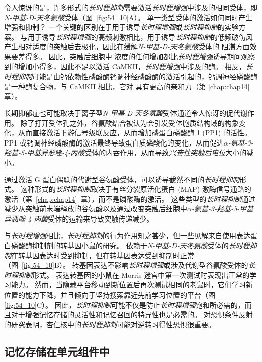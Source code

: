 令人惊讶的是，许多形式的\textit{长时程抑制}需要激活\textit{长时程增强}中涉及的相同受体，即\textit{N-甲基-D-天冬氨酸}受体（图~\ref{fig:54_10}A）。
单一类型受体的激活如何同时产生增强和抑制？
一个关键的区别在于用于诱导\textit{长时程增强}或\textit{长时程抑制}的实验方案。
与用于诱导\textit{长时程增强}的高频刺激相比，用于诱导\textit{长时程抑制}的低频破伤风产生相对适度的突触后去极化，因此在缓解\textit{N-甲基-D-天冬氨酸}受体的  阻滞方面效果要差得多。
因此，突触后细胞中  浓度的任何增加都比\textit{长时程增强}诱导期间观察到的增加小得多，因此不足以激活 CaMKII，\textit{长时程增强}中涉及的酶。
相反，\textit{长时程抑制}可能是由钙依赖性磷酸酶钙调神经磷酸酶的激活引起的，钙调神经磷酸酶是一种酶复合物，与 CaMKII 相比，它对  具有更高的亲和力（第 \ref{chap:chap14} 章）。


长期抑郁症也可能取决于离子型\textit{N-甲基-D-天冬氨酸}受体通道令人惊讶的促代谢作用。
除了打开受体孔之外，谷氨酸结合被认为会引发受体胞质结构域的构象变化，从而直接激活下游信号级联反应，从而增加磷蛋白磷酸酶 1 (PP1) 的活性。
PP1 或钙调神经磷酸酶的激活最终导致蛋白质磷酸化的变化，从而促进\textit{$\alpha$-氨基-3-羟基-5-甲基异恶唑-4-丙酸}受体的内吞作用，从而导致\textit{兴奋性突触后电位}大小的减小。


通过激活 G 蛋白偶联的代谢型谷氨酸受体，可以诱导截然不同的\textit{长时程抑制}形式。
这种形式的\textit{长时程抑制}取决于有丝分裂原活化蛋白 (MAP) 激酶信号通路的激活（第~\ref{chap:chap14}~章），而不是磷酸酶的激活。
这些类型的\textit{长时程抑制}通过减少从突触前末端释放的谷氨酸以及通过改变突触后细胞中\textit{$\alpha$-氨基-3-羟基-5-甲基异恶唑-4-丙酸}受体的运输来导致突触传递减少。


与\textit{长时程增强}相比，\textit{长时程抑制}的行为作用知之甚少，但一些见解来自使用表达蛋白磷酸酶抑制剂的转基因小鼠的研究。
依赖于\textit{N-甲基-D-天冬氨酸}受体的\textit{长时程抑制}在转基因表达时受到抑制，但在转基因表达受到抑制时正常（图~\ref{fig:54_10}B）。
转基因表达不影响\textit{长时程增强}或涉及代谢型谷氨酸受体的\textit{长时程抑制}形式。
表达转基因的小鼠在 Morris 迷宫中第一次测试时表现出正常的学习能力。
然而，当隐藏平台移动到新位置后再次测试相同的老鼠时，它们学习新位置的能力下降，并且倾向于坚持搜索靠近先前学习位置的平台（图 \ref{fig:54_10}C）。
因此，\textit{长时程抑制}可能不仅是防止\textit{长时程增强}饱和所必需的，而且对于增强记忆存储的灵活性和记忆召回的特异性也是必需的。
对恐惧条件反射的研究表明，杏仁核中的\textit{长时程抑制}可能对逆转习得性恐惧很重要。



\subsection{记忆存储在单元组件中}

